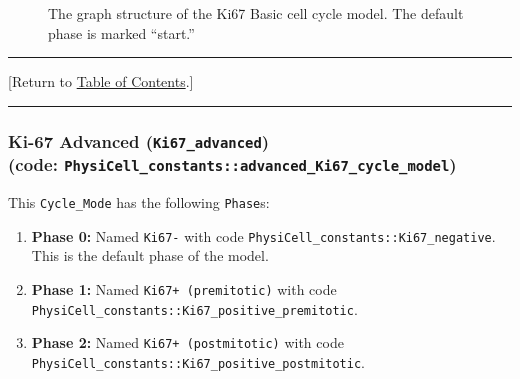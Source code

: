 \documentclass[12pt]{article}
\renewcommand{\v}{\verb}
\newcommand{\TOClink}{\begin{center}\hrule\vskip-10pt\phantom{.}\hfill[Return to \hyperlink{TOC}{Table of Contents}.]\hfill\phantom{.}\vskip3pt\hrule\end{center}}
\begin{document}
\begin{figure}
\begin{mdframed}[style=mystyle]
\caption{The graph structure of the Ki67 Basic cell cycle model. The default phase is marked 
``start.''}
\label{fig:cycle_model:ki67_basic}
\end{mdframed}
\end{figure}

\TOClink 

\subsubsection{Ki-67 Advanced (\texttt{Ki67\_advanced})\\
(code: \texttt{PhysiCell\_constants::advanced\_Ki67\_cycle\_model})}
\label{sec:Standard_Models:Ki67_Advanced}
This \v|Cycle_Mode| has the following \v|Phase|s: 
\begin{enumerate}
\item 
\textbf{Phase 0:} Named \v|Ki67-| with code \v|PhysiCell_constants::Ki67_negative|. This is the default 
phase of the model. 

\item 
\textbf{Phase 1:} Named \v|Ki67+ (premitotic)| with code \\ \v|PhysiCell_constants::Ki67_positive_premitotic|. 

\item 
\textbf{Phase 2:} Named \v|Ki67+ (postmitotic)| with code \\ \v|PhysiCell_constants::Ki67_positive_postmitotic|. 

\end{enumerate}
\end{document}
